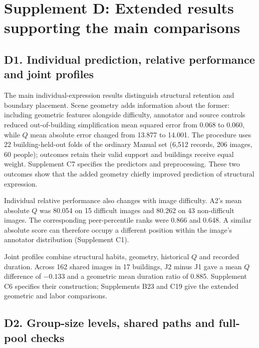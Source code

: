 \section*{Supplement D: Extended results supporting the main comparisons}

\subsection*{D1. Individual prediction, relative performance and joint profiles}
\label{supp:d1-individual}

The main individual-expression results distinguish structural retention and boundary placement. Scene geometry adds information about the former: including geometric features alongside difficulty, annotator and source controls reduced out-of-building simplification mean squared error from 0.068 to 0.060, while $Q$ mean absolute error changed from 13.877 to 14.001. The procedure uses 22 building-held-out folds of the ordinary Manual set (6,512 records, 206 images, 60 people); outcomes retain their valid support and buildings receive equal weight. Supplement C7 specifies the predictors and preprocessing. These two outcomes show that the added geometry chiefly improved prediction of structural expression.

Individual relative performance also changes with image difficulty. A2's mean absolute $Q$ was 80.054 on 15 difficult images and 80.262 on 43 non-difficult images. The corresponding peer-percentile ranks were 0.866 and 0.648. A similar absolute score can therefore occupy a different position within the image's annotator distribution (Supplement C1).

Joint profiles combine structural habits, geometry, historical $Q$ and recorded duration. Across 162 shared images in 17 buildings, J2 minus J1 gave a mean $Q$ difference of $-0.133$ and a geometric mean duration ratio of 0.885. Supplement C6 specifies their construction; Supplements B23 and C19 give the extended geometric and labor comparisons.

\subsection*{D2. Group-size levels, shared paths and full-pool checks}
\label{supp:d2-size}

